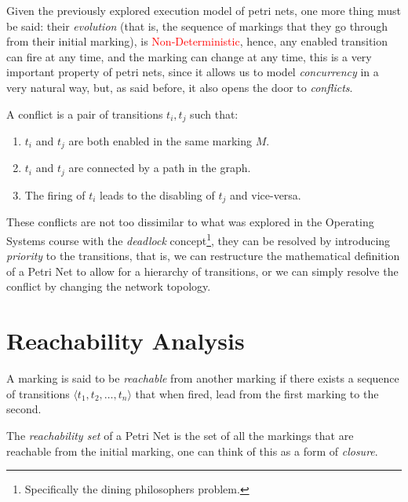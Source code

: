 \documentclass[openright, twoside, twocolumn]{report}
\begin{document}
    Given the previously explored execution model of petri nets, one more thing must be said:
    their \emph{evolution} (that is, the sequence of markings that they go through from their initial marking), is \textcolor{red}{Non-Deterministic}, hence, any enabled transition can fire at any time, and the marking can change at any time, this is a very important property of petri nets, since it allows us to model \emph{concurrency} in a very natural way, but, as said before, it also opens the door to \emph{conflicts}.

    \begin{definition}[Conflicts]
      \label{def:conflicts}

      A conflict is a pair of transitions $t_i, t_j$ such that:

      \begin{enumerate}
        \item $t_i$ and $t_j$ are both enabled in the same marking $M$.
        \item $t_i$ and $t_j$ are connected by a path in the graph.
        \item The firing of $t_i$ leads to the disabling of $t_j$ and vice-versa.
      \end{enumerate}

    \end{definition}

    These conflicts are not too dissimilar to what was explored in the
    Operating Systems course with the \emph{deadlock} concept\footnote{
      Specifically the dining philosophers problem.
    }, they can be resolved by introducing \emph{priority} to the transitions, that is, we can
    restructure the mathematical definition of a Petri Net to allow for a hierarchy of transitions, or we can simply resolve the conflict by changing the network topology.

    \section{Reachability Analysis}

    A marking is said to be \emph{reachable} from another marking if there exists a sequence
    of transitions $\langle t_1, t_2, \ldots, t_n \rangle$ that when fired, lead from the first marking to the second.

    \begin{definition}
      The \emph{reachability set} of a Petri Net is the set of all the markings that are reachable from the initial marking, one can think of this as a form of \emph{closure}.
    \end{definition}
\end{document}
